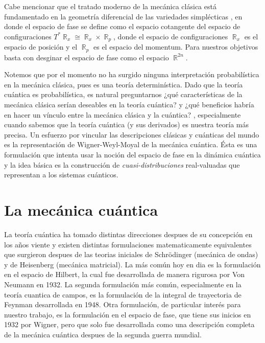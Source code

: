 \documentclass[a4paper]{report}
\DeclareMathOperator{\R}{\mathbb{R}}
\begin{document}
  Cabe mencionar que el tratado moderno de la mecánica
  clásica está fundamentado en la geometría diferencial de
  las variedades simplécticas
  \cite{mcinerneyFirstStepsDifferential2013}, en donde el
  espacio de fase se define como el espacio cotangente del
  espacio de configuraciones $T^{*} \R_x \cong \R_x \times
  \R_p$, donde el espacio de configuraciones  $\R_x$ es el
  espacio de posición y el $\R_p$ es el espacio del
  momentum.  Para nuestros objetivos basta con desginar el
  espacio de fase como el espacio $\R^{2n}$.

  Notemos que por el momento no ha surgido ninguna
  interpretación probabilística en la mecánica clásica, pues
  es una teoría determinística. Dado que la teoría cuántica
  es probabilística, es natural preguntarnos ¿qué
  características de la mecánica clásica serían deseables en
  la teoría cuántica? y ¿qué beneficios habría en hacer un
  vínculo entre la mecánica clásica y la cuántica?
  \cite{schroeckQuantumMechanicsPhase1996}, especialmente
  cuando sabemos que la teoría cuántica (y sus derivados) es
  nuestra teoría más precisa. Un esfuerzo por vincular las
  descripciones clásicas y cuánticas del mundo es la
  representación de Wigner-Weyl-Moyal de la mecánica
  cuántica.  Ésta es una formulación que intenta usar la
  noción del espacio de fase en la dinámica cuántica y la
  idea básica es la construcción de
  \textit{cuasi-distribuciones} real-valuadas que
  representan a los sistemas cuánticos.

  \section{La mecánica cuántica}

  La teoría cuántica ha tomado distintas direcciones despues
  de su concepción en los años viente y existen distintas
  formulaciones matematicamente equivalentes que surgieron
  despues de las teorias iniciales de Schrödinger (mecánica
  de ondas) y de Heisenberg (mecánica matricial).  La más
  común hoy en dia es la formulación en el espacio de
  Hilbert, la cual fue desarrollada de manera rigurosa por
  Von Neumann en 1932.  La segunda formulación más común,
  especialmente en la teoría cuantica de campos, es la
  formulación de la integral de trayectoria de Feynman
  desarrollada en 1948.  Otra formulación, de particular
  interés para nuestro trabajo, es la formulación en el
  espacio de fase, que tiene sus inicios en 1932 por Wigner,
  pero que solo fue desarrollada como una descripción
  completa de la mecánica cuántica despues de la segunda
  guerra mundial. 
\end{document}
